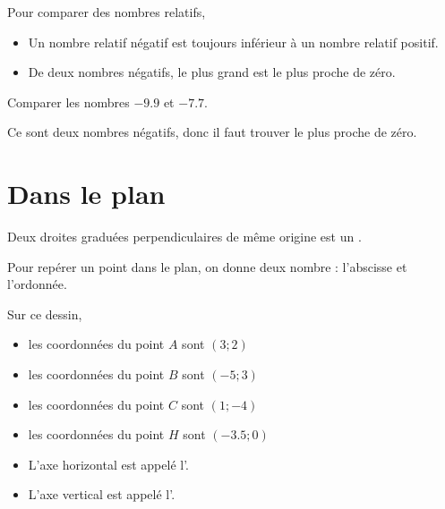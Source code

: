 \begin{Aretenir}
    Pour comparer des nombres relatifs,
    \begin{itemize}
\item
Un nombre relatif négatif est toujours inférieur à un nombre relatif positif. 
\item
    De deux nombres négatifs, le plus grand est le plus proche de zéro.
    \end{itemize}
\end{Aretenir}

\begin{example}
    Comparer les nombres \( -9.9\) et \( -7.7\).
       
    Ce sont deux nombres négatifs, donc il faut trouver le plus proche de zéro.
\end{example}

\section{Dans le plan}



\begin{definition}
    Deux droites graduées perpendiculaires de même origine est un . 
\end{definition}

\begin{Aretenir}
    Pour repérer un point dans le plan, on donne deux nombre : l'abscisse et l'ordonnée.
\end{Aretenir}

\begin{example}
    \begin{center}
        
    \end{center}
    Sur ce dessin,
    \begin{itemize}
        \item les coordonnées du point \( A\) sont \(  (3;2)  \)
        \item les coordonnées du point \( B\) sont \(  (-5;3)  \)
        \item les coordonnées du point \( C\) sont \(  (1;-4)  \)
        \item les coordonnées du point \( H\) sont \(  (-3.5;0)  \)
    \end{itemize}
\end{example}

\begin{definition}
    \begin{itemize}
        \item 
            L'axe horizontal est appelé l'.
        \item
            L'axe vertical est appelé l'.
    \end{itemize}
\end{definition}


